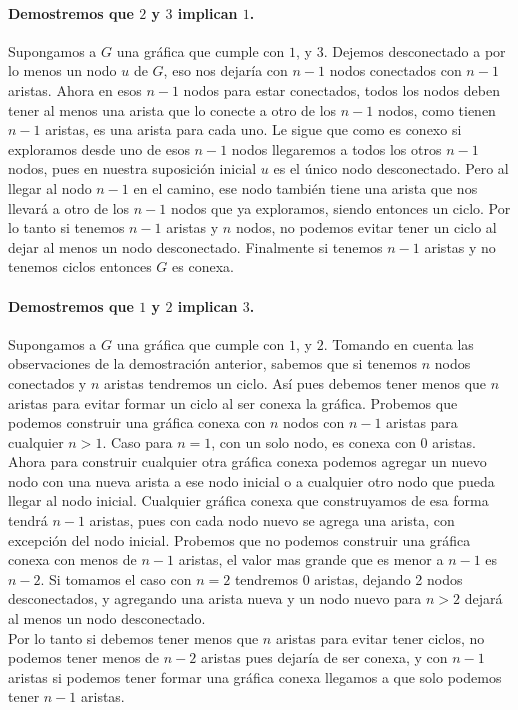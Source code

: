 \documentclass[12pt]{article}
\begin{document}
\paragraph{Demostremos que $2$ y $3$ implican $1$.}
Supongamos a $G$ una gráfica que cumple con $1$, y $3$. Dejemos desconectado a por lo menos un nodo $u$ de $G$, eso nos dejaría con $n-1$ nodos conectados con $n-1$ aristas. Ahora en esos $n-1$ nodos para estar conectados, todos los nodos deben tener al menos una arista que lo conecte a otro de los $n-1$ nodos, como tienen $n-1$ aristas, es una arista para cada uno. Le sigue que como es conexo si exploramos desde uno de esos $n-1$ nodos llegaremos a todos los otros $n-1$ nodos, pues en nuestra suposición inicial $u$ es el único nodo desconectado. Pero al llegar al nodo $n-1$ en el camino, ese nodo también tiene una arista que nos llevará a otro de los $n-1$ nodos que ya exploramos, siendo entonces un ciclo. Por lo tanto si tenemos $n-1$ aristas y $n$ nodos, no podemos evitar tener un ciclo al dejar al menos un nodo desconectado. Finalmente si tenemos $n-1$ aristas y no tenemos ciclos entonces $G$ es conexa.
\pagebreak
\paragraph{Demostremos que $1$ y $2$ implican $3$.}
Supongamos a $G$ una gráfica que cumple con $1$, y $2$. Tomando en cuenta las observaciones de la demostración anterior, sabemos que si tenemos $n$ nodos conectados y $n$ aristas tendremos un ciclo. Así pues debemos tener menos que $n$ aristas para evitar formar un ciclo al ser conexa la gráfica. Probemos que podemos construir una gráfica conexa con $n$ nodos con $n-1$ aristas para cualquier $n>1$. Caso para $n=1$, con un solo nodo, es conexa con $0$ aristas. Ahora para  construir cualquier otra gráfica conexa podemos agregar un nuevo nodo con una nueva arista a ese nodo inicial o a cualquier otro nodo que pueda llegar al nodo inicial. Cualquier gráfica conexa que construyamos de esa forma  tendrá $n-1$ aristas, pues con cada nodo nuevo se agrega una arista, con excepción del nodo inicial. Probemos que no podemos construir una gráfica conexa con menos de $n-1$ aristas, el valor mas grande que es menor a $n-1$ es $n-2$. Si tomamos el caso con $n=2$ tendremos 0 aristas, dejando 2 nodos desconectados, y agregando una arista nueva y un nodo nuevo para $n>2$ dejará al menos un nodo desconectado.\\
Por lo tanto si debemos tener menos que $n$ aristas para evitar tener ciclos, no podemos tener menos de $n-2$ aristas pues dejaría de ser conexa, y con $n-1$ aristas si podemos tener  formar una gráfica conexa llegamos a que solo podemos tener $n-1$ aristas.
\end{document}
